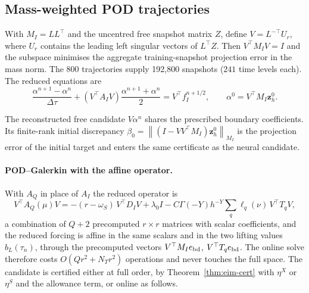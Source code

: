 \documentclass[hidelinks]{siamart251216}
\newcommand{\norm}[1]{\left\lVert #1\right\rVert}
\newcommand{\dt}{\Delta\tau}
\newcommand{\zz}{\mathbf z}
\newcommand{\rf}{r}
\begin{document}
\subsection{Mass-weighted POD trajectories}
\label{ssec:pod-construction}
With $M_I=LL^\top$ and the uncentred free snapshot matrix $Z$, define
$V=L^{-\top}U_r$, where $U_r$ contains the leading left singular vectors of
$L^\top Z$. Then $V^\top M_IV=I$ and the subspace minimises the aggregate
training-snapshot projection error in the mass norm. The 800 trajectories
supply 192,800 snapshots ($241$ time levels each). The reduced equations are
\begin{equation}
 \frac{\alpha^{n+1}-\alpha^n}{\dt}
 + (V^\top A_I V)\frac{\alpha^{n+1}+\alpha^n}{2}
 = V^\top f_I^{n+1/2},\qquad
 \alpha^0=V^\top M_I \zz_h^0.
 \label{eq:repaired-pod-cn}
\end{equation}

The reconstructed free candidate $V\alpha^n$ shares the prescribed boundary
coefficients. Its finite-rank initial discrepancy $\beta_0=\norm{(I-VV^\top M_I)\zz_h^0}_{M_I}$
is the projection error of the initial target and enters the same certificate as the neural
candidate.

\paragraph{POD--Galerkin with the affine operator.}
With $A_Q$ in place of $A_I$ the reduced operator is
\[
V^\top A_Q(\mu)V=-(\rf-\omega_S)\,V^\top D_IV+\lambda_0 I-C\Gamma(-Y)h^{-Y}\sum_q\ell_q(\nu)\,V^\top T_qV,
\]
a combination of $Q+2$ precomputed $r\times r$ matrices with scalar coefficients, and the
reduced forcing is affine in the same scalars and in the two lifting values $b_L(\tau_n)$, through
the precomputed vectors $V^\top M_I e_{\rm bd}$, $V^\top T_q e_{\rm bd}$.  The online solve therefore
costs $O(Qr^2+N_Tr^2)$ operations and never touches the full space.  The candidate is certified
either at full order, by Theorem~\ref{thm:eim-cert} with $\eta^X$ or $\eta^S$ and the allowance
term, or online as follows.
\end{document}
